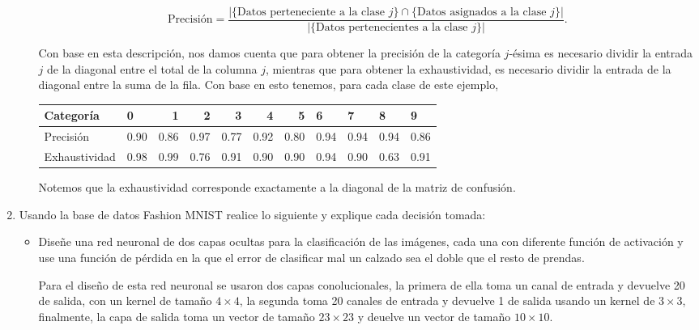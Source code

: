 \documentclass{article}
\begin{document}
\begin{enumerate}
\begin{itemize}
        \begin{equation*}
            \mathrm{Precisión} = \frac{|\{\text{Datos perteneciente a la clase }j\}
            \cap \{\text{Datos asignados a la clase }j\}|}
            {|\{\text{Datos pertenecientes a la clase } j\}|}.
        \end{equation*}

        Con base en esta descripción, nos damos cuenta que para obtener la precisión de
        la categoría $j$-ésima es
        necesario dividir la entrada $j$ de la diagonal entre el total de la columna $j$,
        mientras que para obtener la exhaustividad, es necesario dividir la entrada de la 
        diagonal entre la suma de la fila. Con base en esto tenemos, para cada
        clase de este ejemplo,

        \begin{center}
            \begin{tabular}{lrrrrrrrrrr}
                \hline
                Categoría & \multicolumn{1}{l}{0} & 1 & 2 & 3 & 4 & 5 & \multicolumn{1}{l}{6} & \multicolumn{1}{l}{7} & \multicolumn{1}{l}{8} & \multicolumn{1}{l}{9} \\ \hline
                Precisión & 0.90 & 0.86 & 0.97 & 0.77 & 0.92 & 0.80 & 0.94 & 0.94 & 0.94 & 0.86 \\
                Exhaustividad & 0.98 & 0.99 & 0.76 & 0.91 & 0.90 & 0.90 & 0.94 & 0.90 & 0.63 & 0.91 \\ \hline
                \end{tabular}
        \end{center}

        Notemos que la exhaustividad corresponde exactamente a la diagonal de la matriz de
        confusión.
    \end{itemize}


    \item Usando la base de datos Fashion MNIST realice lo siguiente y explique
cada decisión tomada:

    \begin{itemize}
        \item Diseñe una red neuronal de dos capas ocultas para la clasificación 
        de las imágenes, cada una con diferente función de activación y use una 
        función de pérdida en la que el error de clasificar mal un calzado sea el 
        doble que el resto de prendas.

        Para el diseño de esta red neuronal se usaron dos capas conolucionales, la 
        primera de ella toma un canal de entrada y devuelve 20 de salida, con un
        kernel de tamaño $4\times4$, la segunda toma 20 canales de entrada y devuelve
        1 de salida usando un kernel de $3\times3$, finalmente, la capa de salida 
        toma un vector de tamaño $23\times23$ y deuelve un vector de tamaño $10\times10$.
        

\end{itemize}
\end{enumerate}
\end{document}
